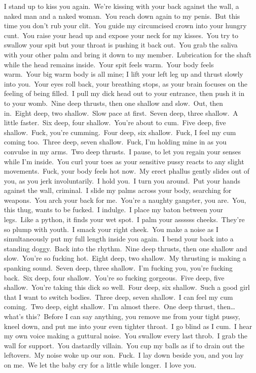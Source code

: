 \begin{fullwidth}
I stand up to kiss you again.\
We're kissing with your back against the wall, a naked man and a naked woman.\
You reach down again to my penis.\
But this time you don't rub your clit.\
You guide my circumcised crown into your hungry cunt.\
You raise your head up and expose your neck for my kisses.\
You try to swallow your spit but your throat is pushing it back out.\
You grab the saliva with your other palm and bring it down to my member.\
Lubrication for the shaft while the head remains inside.\
Your spit feels warm.\
Your body feels warm.\
Your big warm body is all mine; I lift your left leg up and thrust slowly into you.\
Your eyes roll back, your breathing stops, as your brain focuses on the feeling of being filled.\
I pull my dick head out to your entrance, then push it in to your womb.\
Nine deep thrusts, then one shallow and slow.\
Out, then in.\
Eight deep, two shallow.\
Slow pace at first.\
Seven deep, three shallow.\
A little faster.\
Six deep, four shallow.\
You're about to cum.\
Five deep, five shallow.\
Fuck, you're cumming.\
Four deep, six shallow.\
Fuck, I feel my cum coming too.\
Three deep, seven shallow.\
Fuck, I'm holding mine in as you convulse in my arms.\
Two deep thrusts.\
I pause, to let you regain your senses while I'm inside.\
You curl your toes as your sensitive pussy reacts to any slight movements.\
Fuck, your body feels hot now.\
My erect phallus gently slides out of you, as you jerk involuntarily.\
I hold you.\
I turn you around.\
Put your hands against the wall, criminal.\
I slide my palms across your body, searching for weapons.\
You arch your back for me.\
You're a naughty gangster, you are.\
You, this thug, wants to be fucked.\
I indulge.\
I place my baton between your legs.\
Like a python, it finds your wet spot.\
I palm your assssss cheeks.\
They're so plump with youth.\
I smack your right cheek.\
You make a noise as I simultaneously put my full length inside you again.\
I bend your back into a standing doggy.\
Back into the rhythm.\
Nine deep thrusts, then one shallow and slow.\ 
You're so fucking hot.\
Eight deep, two shallow.\
My thrusting is making a spanking sound.\
Seven deep, three shallow.\
I'm fucking you, you're fucking back.\
Six deep, four shallow.\
You're so fucking gorgeous.\
Five deep, five shallow.\
You're taking this dick so well.\
Four deep, six shallow.\
Such a good girl that I want to switch bodies.\
Three deep, seven shallow.\
I can feel my cum coming.\
Two deep, eight shallow.\
I'm almost there.\
One deep thrust, then\ldots what's this?\
Before I can say anything, you remove me from your tight pussy, kneel down, and put me into your even tighter throat.\
I go blind as I cum.\
I hear my own voice making a guttural noise.\
You swallow every last throb.\
I grab the wall for support.\
You dastardly villain.\
You cup my balls as if to drain out the leftovers.\
My noise woke up our son.\
Fuck.\
I lay down beside you, and you lay on me.\
We let the baby cry for a little while longer.\
I love you.
\end{fullwidth}
\linenumbers
